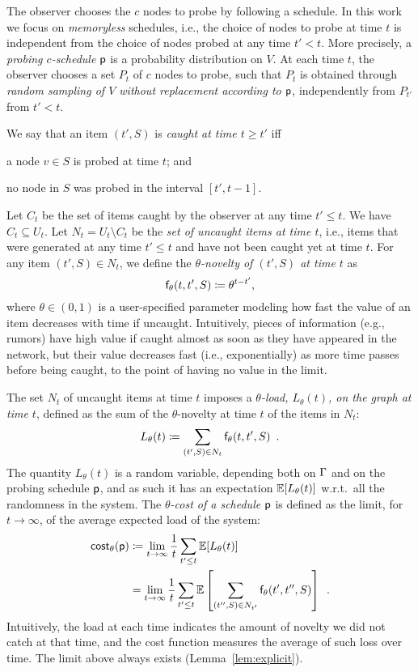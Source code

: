 The observer chooses the $c$ nodes to probe by following a schedule. In this work
we focus on \emph{memoryless} schedules, i.e., the choice of nodes to probe at
time $t$ is independent from the choice of nodes probed at any time $t'<t$.
More precisely, a \emph{probing $c$-schedule} $\mathsf{p}$ is a probability
distribution on $V$. At each time $t$, the observer chooses a set $P_t$ of $c$
nodes to probe, such that $P_t$ is obtained through \emph{random sampling of $V$
without replacement according to $\mathsf{p}$}, independently from $P_{t'}$ from
$t'< t$.

We say that an item $(t',S)$ is \emph{caught at time $t\ge t'$} iff
\begin{enumerate*}
	\item a node $v\in S$ is probed at time $t$; and
	\item no node in $S$ was probed in the interval $[t',t-1]$.
\end{enumerate*}

Let $C_t$ be the set of items caught by the observer at any time $t'\le t$. We
have $C_t\subseteq U_t$. Let $N_t= U_t\setminus C_t$ be the \emph{set of
uncaught items at time $t$}, i.e., items that were generated at any time
$t'\le t$ and have not been caught yet at time $t$. For any item $(t',S)\in
N_t$, we define the \emph{$\theta$-novelty of $(t',S)$ at time $t$} as
\[
	\mathsf{f}_\theta(t,t',S)\coloneqq\theta^{t-t'},
\]
where $\theta\in(0,1)$ is a user-specified parameter modeling how fast the
value of an item decreases with time if uncaught. Intuitively, pieces of
information (e.g., rumors) have high value if caught almost as soon as they have
appeared in the network, but their value decreases fast (i.e., exponentially) as
more time passes before being caught, to the point of having no value in the
limit.

 The set $N_t$ of uncaught items
at time $t$ imposes a \emph{$\theta$-load, $L_\theta(t)$, on the graph at time
$t$}, defined as the sum of the $\theta$-novelty at time $t$ of the items in
$N_t$:
\[
	L_\theta(t)\coloneqq\sum_{(t',S)\in N_t} \mathsf{f}_\theta(t,t',S)\enspace.
\]
The quantity $L_\theta(t)$ is a random variable, depending both on $\Gamma$ and on
the probing schedule $\mathsf{p}$, and as such it has an expectation
$\mathbb{E}[L_\theta(t)]$ w.r.t.~all the randomness in the system. The
\emph{$\theta$-cost of a schedule $\mathsf{p}$} is defined as the limit, for
$t\rightarrow\infty$, of the average expected load of the system:
\begin{align*}
	\mathsf{cost}_\theta(\mathsf{p})&\coloneqq\lim_{t\rightarrow\infty}\frac{1}{t}\sum_{t'\le
	t}\mathbb{E}[L_\theta(t)]\\
	&=\lim_{t\rightarrow\infty}\frac{1}{t}\sum_{t'\le
	t}\mathbb{E}\left[\sum_{(t'',S)\in N_{t'}}\mathsf{f}_\theta(t',t'',S)\right]\enspace.
\end{align*}
Intuitively, the load at each time indicates the amount of novelty we did not
catch at that time, and the cost function measures the average of such loss over
time. The limit above always exists (Lemma~\ref{lem:explicit}).

